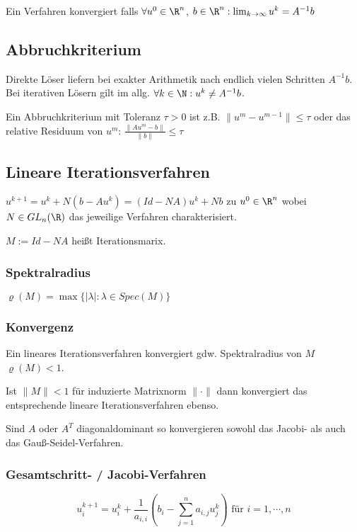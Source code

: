 Ein Verfahren konvergiert falls $\forall u^0 \in \R^n$, $b \in \R^n : \lim_{k\to \infty} u^k = A^{-1}b$

\subsection*{Abbruchkriterium}

Direkte Löser liefern bei exakter Arithmetik nach endlich vielen Schritten $A^{-1}b$. Bei iterativen Lösern gilt im allg. $\forall k \in \N : u^k \neq A^{-1}b$.

Ein Abbruchkriterium mit Toleranz $\tau > 0$ ist z.B. $\|u^m-u^{m-1}\| \leq \tau$ oder das relative Residuum von $u^m$: $\frac{\|Au^m-b\|}{\|b\|} \leq \tau$

\subsection*{Lineare Iterationsverfahren}

$u^{k+1} = u^k + N(b-Au^k) = (Id - NA)u^k + Nb$ zu $u^0 \in \R^n$ wobei $N \in GL_n(\R)$ das jeweilige Verfahren charakterisiert.

$M := Id - NA$ heißt Iterationsmarix.

\subsubsection*{Spektralradius}

$\varrho(M) = \max\{|\lambda| : \lambda \in Spec(M)\}$

\subsubsection*{Konvergenz}

Ein lineares Iterationsverfahren konvergiert gdw. Spektralradius von $M$ $\varrho(M) < 1$.

Ist $\|M\| < 1$ für induzierte Matrixnorm $\|\cdot\|$ dann konvergiert das entsprechende lineare Iterationsverfahren ebenso.

Sind $A$ oder $A^T$ diagonaldominant so konvergieren sowohl das Jacobi- als auch das Gauß-Seidel-Verfahren.

\subsubsection*{Gesamtschritt- / Jacobi-Verfahren}

$$u_i^{k+1} = u_i^k + \frac{1}{a_{i,i}}\left(b_i - \sum_{j=1}^n a_{i,j} u_j^k \right) \text{ für } i = 1, \cdots, n$$

